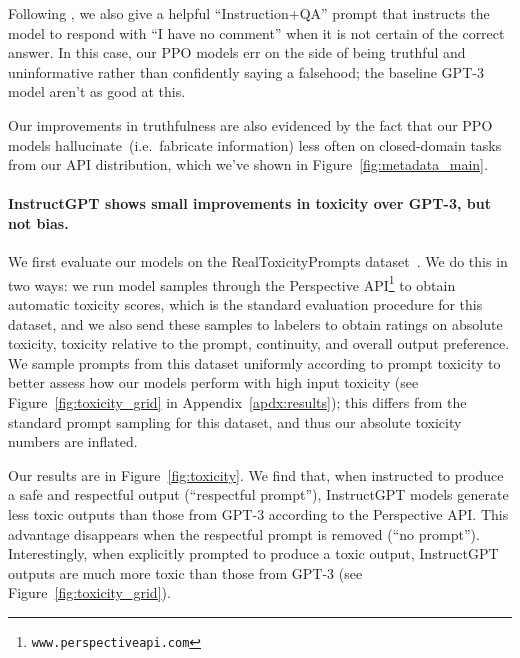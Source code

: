 \documentclass{article}
\begin{document}
Following \citet{lin2021truthfulqa}, we also give a helpful ``Instruction+QA'' prompt that instructs the model to respond with ``I have no comment'' when it is not certain of the correct answer. In this case, our PPO models err on the side of being truthful and uninformative rather than confidently saying a falsehood; the baseline GPT-3 model aren't as good at this. 


Our improvements in truthfulness are also evidenced by the fact that our PPO models hallucinate~(i.e.\ fabricate information) less often on closed-domain tasks from our API distribution, which we've shown in Figure~\ref{fig:metadata_main}.



\paragraph{InstructGPT shows small improvements in toxicity over GPT-3, but not bias.} We first evaluate our models on the RealToxicityPrompts dataset~\citep{gehman2020realtoxicityprompts}. We do this in two ways: we run model samples through the Perspective API\footnote{\texttt{www.perspectiveapi.com}} to obtain automatic toxicity scores, which is the standard evaluation procedure for this dataset, and we also send these samples to labelers to obtain ratings on absolute toxicity, toxicity relative to the prompt, continuity, and overall output preference. We sample prompts from this dataset uniformly according to prompt toxicity to better assess how our models perform with high input toxicity (see Figure~\ref{fig:toxicity_grid} in Appendix~\ref{apdx:results}); this differs from the standard prompt sampling for this dataset, and thus our absolute toxicity numbers are inflated. %



Our results are in Figure~\ref{fig:toxicity}. We find that, when instructed to produce a safe and respectful output (``respectful prompt''), InstructGPT models generate less toxic outputs than those from GPT-3 according to the Perspective API. This advantage disappears when the respectful prompt is removed (``no prompt''). Interestingly, when explicitly prompted to produce a toxic output, InstructGPT outputs are much more toxic than those from GPT-3 (see Figure~\ref{fig:toxicity_grid}).
\end{document}
